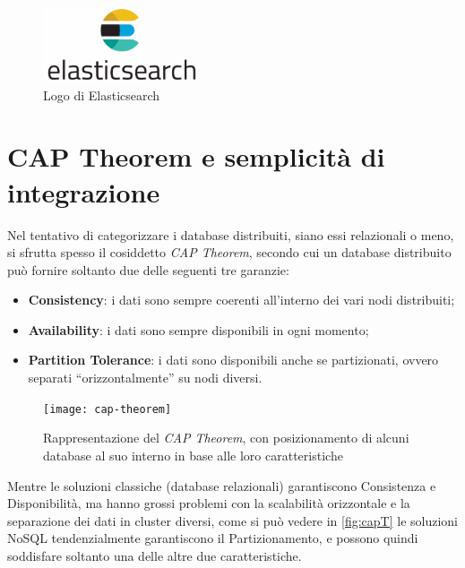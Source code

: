 \begin{figure}[htbp]
\begin{center}
\includegraphics[height=6em]{immagini/tecnologies-logos/Elasticsearch-Logo.png}
\caption{Logo di Elasticsearch}
\label{fig:elastic}
\end{center}
\end{figure}

\section{CAP Theorem e semplicità di integrazione}
\label{sec:cap-theorem-integrazione}

Nel tentativo di categorizzare i database distribuiti, siano essi relazionali o meno, si sfrutta spesso il cosiddetto \textit{CAP Theorem}\cite{site:captheorem}, secondo cui un database distribuito può fornire soltanto due delle seguenti tre garanzie:
\begin{itemize}
    \item \textbf{Consistency}: i dati sono sempre coerenti all'interno dei vari nodi distribuiti;
    \item \textbf{Availability}: i dati sono sempre disponibili in ogni momento;
    \item \textbf{Partition Tolerance}: i dati sono disponibili anche se partizionati, ovvero separati ``orizzontalmente'' su nodi diversi.
\end{itemize}

\vspace{10pt}
\begin{figure}[htbp]
\begin{center}
\texttt{[image: cap-theorem]}
\caption{Rappresentazione del \textit{CAP Theorem}, con posizionamento di alcuni database al suo interno in base alle loro caratteristiche}
\label{fig:capT}
\end{center}
\end{figure}
\vspace{10pt} 

\noindent Mentre le soluzioni classiche (database relazionali) garantiscono Consistenza e Disponibilità, ma hanno grossi problemi con la scalabilità orizzontale e la separazione dei dati in cluster diversi, come si può vedere in \autoref{fig:capT} le soluzioni NoSQL tendenzialmente garantiscono il Partizionamento, e possono quindi soddisfare soltanto una delle altre due caratteristiche.\\

